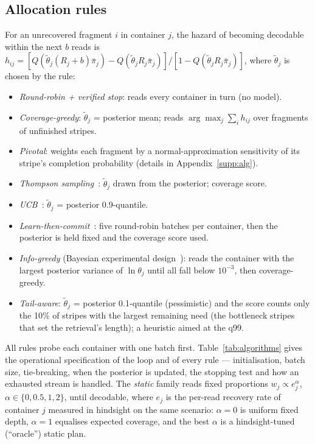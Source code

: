\documentclass[acmsmall,screen]{acmart}
\begin{document}
\subsection{Allocation rules}
For an unrecovered fragment $i$ in container $j$, the hazard of becoming decodable within the
next $b$ reads is
$h_{ij}=[Q(\tilde\theta_j(R_j{+}b)\bar\pi_j)-Q(\tilde\theta_jR_j\bar\pi_j)]/[1-Q(\tilde\theta_jR_j\bar\pi_j)]$,
where $\tilde\theta_j$ is chosen by the rule:
\begin{itemize}
\item \emph{Round-robin + verified stop}: reads every container in turn (no model).
\item \emph{Coverage-greedy}: $\tilde\theta_j$ = posterior mean; reads $\arg\max_j\sum_i h_{ij}$
over fragments of unfinished stripes.
\item \emph{Pivotal}: weights each fragment by a normal-approximation sensitivity of its
stripe's completion probability (details in Appendix~\ref{supp:alg}).
\item \emph{Thompson sampling}~\cite{thompson1933likelihood,russo2018tutorial}: $\tilde\theta_j$
drawn from the posterior; coverage score.
\item \emph{UCB}~\cite{auer2002finite}: $\tilde\theta_j$ = posterior 0.9-quantile.
\item \emph{Learn-then-commit}~\cite{garivier2016explore}: five round-robin batches per
container, then the posterior is held fixed and the coverage score used.
\item \emph{Info-greedy} (Bayesian experimental design~\cite{chaloner1995bayesian}): reads the
container with the largest posterior variance of $\ln\theta_j$ until all fall below $10^{-3}$,
then coverage-greedy.
\item \emph{Tail-aware}: $\tilde\theta_j$ = posterior 0.1-quantile (pessimistic) and the score
counts only the 10\% of stripes with the largest remaining need (the bottleneck stripes that
set the retrieval's length); a heuristic aimed at the q99.
\end{itemize}
All rules probe each container with one batch first.  Table~\ref{tab:algorithms} gives the
operational specification of the loop and of every rule --- initialisation, batch size, tie-breaking,
when the posterior is updated, the stopping test and how an exhausted stream is handled.  The
\emph{static} family reads fixed
proportions $w_j\propto e_j^{\alpha}$, $\alpha\in\{0,0.5,1,2\}$, until decodable, where $e_j$ is
the per-read recovery rate of container $j$ measured in hindsight on the same scenario:
$\alpha{=}0$ is uniform fixed depth, $\alpha{=}1$ equalises expected coverage, and the best
$\alpha$ is a hindsight-tuned (``oracle'') static plan.
\end{document}
